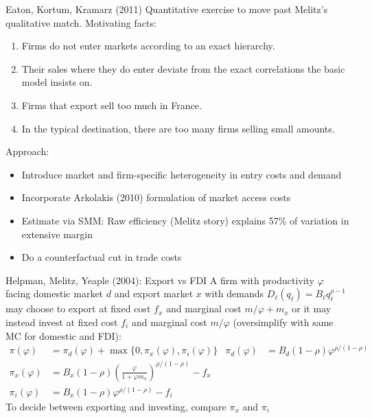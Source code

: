 \documentclass[10pt,notes=hide]{beamer}
\begin{document}
\begin{frame}{Eaton, Kortum, Kramarz (2011)}
Quantitative exercise to move past Melitz's qualitative match. Motivating facts:
\begin{enumerate}
	\item Firms do not enter markets according to an exact hierarchy. 
	\item Their sales where they do enter deviate from the exact correlations the basic model insists on.
	\item Firms that export sell too much in France. 
	\item In the typical destination, there are too many firms selling small amounts.
\end{enumerate}
Approach:
\begin{itemize}
	\item Introduce market and firm-specific heterogeneity in entry costs and demand
	\item Incorporate Arkolakis (2010) formulation of market access costs
	\item Estimate via SMM: Raw efficiency (Melitz story) explains 57\% of variation in extensive margin
	\item Do a counterfactual cut in trade costs
\end{itemize}
\end{frame}
\begin{frame}{Helpman, Melitz, Yeaple (2004): Export vs FDI}
{\small A firm with productivity $\varphi$ facing domestic market $d$ and export market $x$ with demands $D_{\ell}(q_\ell) = B_\ell q_\ell^{\rho-1}$
may choose to export at fixed cost $f_x$ and marginal cost $m/\varphi + m_x$ or it may instead invest at fixed cost $f_i$ and marginal cost $m/\varphi$ (oversimplify with same MC for domestic and FDI):} 
\begin{align*}
\pi(\varphi) &= \pi_d(\varphi) + \max\{0,\pi_x(\varphi),\pi_i(\varphi) \} 
&
\pi_d (\varphi) &= B_d \left(1-\rho\right) \varphi^{\rho/(1-\rho)}
\\
\pi_x (\varphi) &= B_x \left(1-\rho\right) \left(\frac{\varphi}{1+\varphi m_x}\right)^{\rho/(1-\rho)} - f_x
\\
\pi_i (\varphi) &= B_x \left(1-\rho\right) \varphi^{\rho/(1-\rho)} - f_i
\end{align*}
To decide between exporting and investing, compare $\pi_x$ and $\pi_i$
\end{frame}
\end{document}
